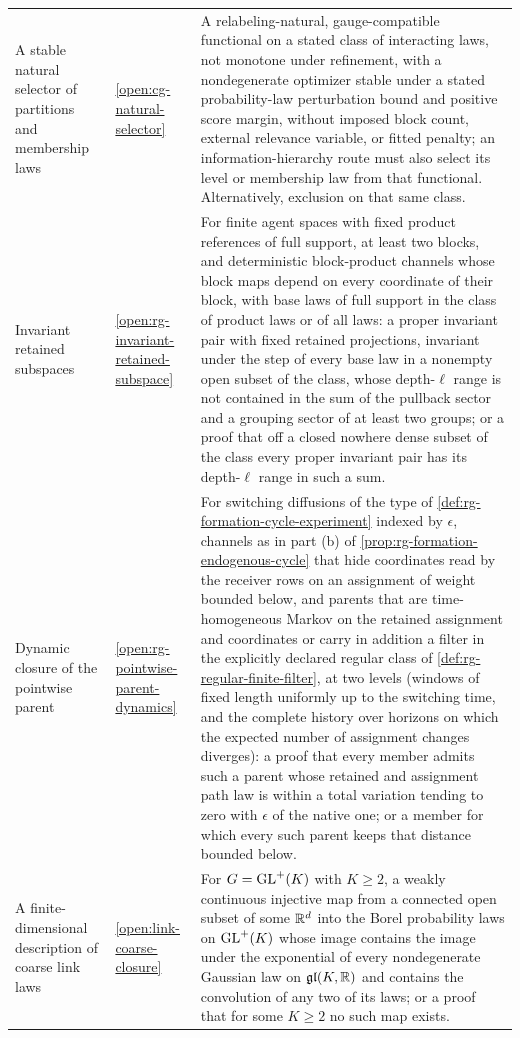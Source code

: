 {\begin{longtable}{@{}>{\raggedright\arraybackslash}p{}
>{\raggedright\arraybackslash}p{}
>{\raggedright\arraybackslash}p{}@{}}
A stable natural selector of partitions and membership laws & \cref{open:cg-natural-selector} & A relabeling-natural, gauge-compatible functional on a stated class of interacting laws, not monotone under refinement, with a nondegenerate optimizer stable under a stated probability-law perturbation bound and positive score margin, without imposed block count, external relevance variable, or fitted penalty; an information-hierarchy route must also select its level or membership law from that functional. Alternatively, exclusion on that same class. \\
Invariant retained subspaces & \cref{open:rg-invariant-retained-subspace} & For finite agent spaces with fixed product references of full support, at least two blocks, and deterministic block-product channels whose block maps depend on every coordinate of their block, with base laws of full support in the class of product laws or of all laws: a proper invariant pair with fixed retained projections, invariant under the step of every base law in a nonempty open subset of the class, whose depth-$\ell$ range is not contained in the sum of the pullback sector and a grouping sector of at least two groups; or a proof that off a closed nowhere dense subset of the class every proper invariant pair has its depth-$\ell$ range in such a sum. \\
Dynamic closure of the pointwise parent & \cref{open:rg-pointwise-parent-dynamics} & For switching diffusions of the type of \cref{def:rg-formation-cycle-experiment} indexed by $\epsilon$, channels as in part (b) of \cref{prop:rg-formation-endogenous-cycle} that hide coordinates read by the receiver rows on an assignment of weight bounded below, and parents that are time-homogeneous Markov on the retained assignment and coordinates or carry in addition a filter in the explicitly declared regular class of \cref{def:rg-regular-finite-filter}, at two levels (windows of fixed length uniformly up to the switching time, and the complete history over horizons on which the expected number of assignment changes diverges): a proof that every member admits such a parent whose retained and assignment path law is within a total variation tending to zero with $\epsilon$ of the native one; or a member for which every such parent keeps that distance bounded below. \\
A finite-dimensional description of coarse link laws & \cref{open:link-coarse-closure} & For $G=\mathrm{GL}^+(K)$ with $K\geq2$, a weakly continuous injective map from a connected open subset of some $\mathbb R^d$ into the Borel probability laws on $\mathrm{GL}^+(K)$ whose image contains the image under the exponential of every nondegenerate Gaussian law on $\mathfrak{gl}(K,\mathbb R)$ and contains the convolution of any two of its laws; or a proof that for some $K\geq2$ no such map exists. \\

\end{longtable}}
